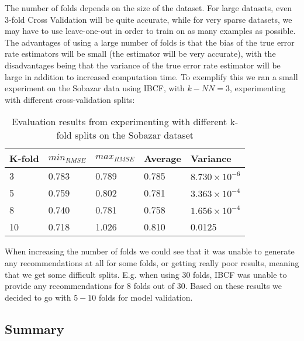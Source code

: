 The number of folds depends on the size of the dataset. For large datasets, even 3-fold Cross Validation will be quite accurate, while for very sparse datasets, we may have to use leave-one-out in order to train on as many examples as possible. The advantages of using a large number of folds is that the bias of the true error rate estimators will be small (the estimator will be very accurate), with the disadvantages being that the variance of the true error rate estimator will be large in addition to increased computation time. To exemplify this we ran a small experiment on the Sobazar data using IBCF, with $k-NN=3$, experimenting with different cross-validation splits:

\begin{table}[H]
\centering
\begin{tabular}{|l|l|l|l|l|}
\hline
K-fold & 	$min_{RMSE}$ 	&	$max_{RMSE}$ 	& Average 	& Variance 					\\ \hline
3	   & 	0.783 			& 	0.789 			& 0.785 	& $8.730 \times 10^{-6}$	\\ \hline
5	   & 	0.759			& 	0.802 			& 0.781 	& $3.363 \times 10^{-4}$ 	\\ \hline
8	   & 	0.740			& 	0.781			& 0.758 	& $1.656 \times 10^{-4}$ 	\\ \hline
10	   & 	0.718 			& 	1.026			& 0.810  	& 0.0125					\\ \hline
\end{tabular}
\caption{Evaluation results from experimenting with different k-fold splits on the Sobazar dataset}
\end{table}

When increasing the number of folds we could see that it was unable to generate any recommendations at all for some folds, or getting really poor results, meaning that we get some difficult splits. E.g. when using 30 folds, IBCF was unable to provide any recommendations for 8 folds out of 30. Based on these results we decided to go with $5-10$  folds for model validation.



\subsection{Summary}




